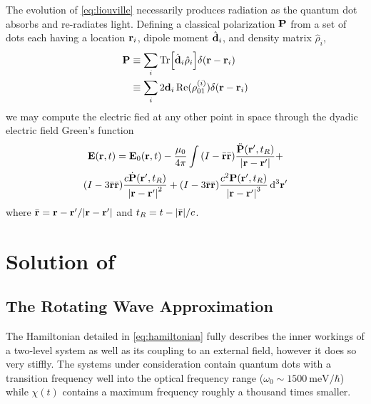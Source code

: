 \documentclass[conference]{IEEEtran}
\begin{document}
The evolution of \cref{eq:liouville} necessarily produces radiation as the quantum dot absorbs and re-radiates light.
Defining a classical polarization $\vb{P}$ from a set of dots each having a location $\vb{r}_i$, dipole moment $\hat{\vb{d}}_i$, and density matrix $\hat{\rho}_i$,
\begin{equation}
  \begin{aligned}
    \vb{P} & \equiv \sum_i \Tr[\hat{\vb{d}}_i \hat{\vb{\rho}}_i]\delta(\vb{r} - \vb{r}_i) \\
    & \equiv \sum_i 2\vb{d}_i \Re(\rho^{\qty(i)}_{01})\delta(\vb{r} - \vb{r}_i)
  \end{aligned}
  \label{eq:polarization}
\end{equation}
we may compute the electric fied at any other point in space through the dyadic electric field Green's function
\begin{equation}
  \begin{gathered}
  \vb{E}(\vb{r}, t) = \vb{E}_0(\vb{r}, t) - \frac{\mu_0}{4\pi} \int 
      \qty(I - \bar{\vb{r}}\bar{\vb{r}}) \frac{\ddot{\vb{P}}(\vb{r}', t_R)}{\abs{\vb{r} - \vb{r}'}} + \\ 
      \qty(I - 3\bar{\vb{r}}\bar{\vb{r}}) \frac{c \dot{\vb{P}}(\vb{r}', t_R)}{\abs{\vb{r} - \vb{r}'}^2} + 
      \qty(I - 3\bar{\vb{r}}\bar{\vb{r}}) \frac{c^2 \vb{P}(\vb{r}', t_R)}{\abs{\vb{r} - \vb{r}'}^3}  
  \dd[3]{\vb{r}'}
  \end{gathered}
\end{equation}
where $\bar{\vb{r}} = \vb{r} - \vb{r}'/\abs{\vb{r} - \vb{r}'}$ and $t_R = t - \abs{\bar{\vb{r}}}/c$.

\section{Solution of }
\subsection{The Rotating Wave Approximation}
The Hamiltonian detailed in \cref{eq:hamiltonian} fully describes the inner workings of a two-level system as well as its coupling to an external field, however it does so very stiffly. 
The systems under consideration contain quantum dots with a transition frequency well into the optical frequency range ($\omega_0 \sim \SI{1500}{\milli \eV}/\hbar$) while $\chi(t)$ contains a maximum frequency roughly a thousand times smaller. 
\end{document}
